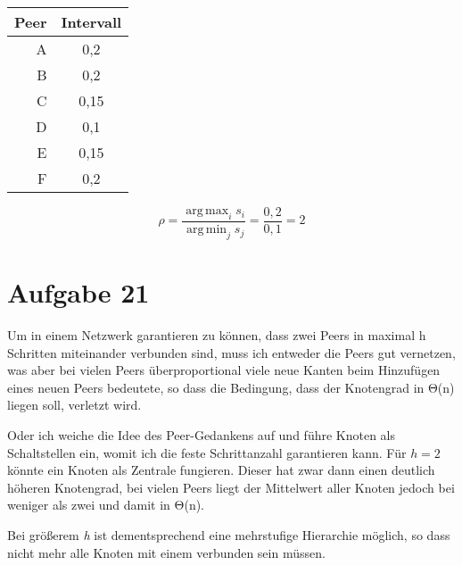 \documentclass[10pt,a4paper]{article}
\DeclareMathOperator*{\argmax}{arg\,max}
\DeclareMathOperator*{\argmin}{arg\,min}
\begin{document}
\begin{tabular}{ r | c }
  Peer & Intervall \\
  \hline
  A & 0,2 \\
  B & 0,2 \\
  C & 0,15 \\
  D & 0,1 \\
  E & 0,15 \\
  F & 0,2 \\
\end{tabular}

\begin{equation}
  \rho = \frac{\argmax_i s_i}{\argmin_j s_j} = \frac{0,2}{0,1} = 2
\end{equation}

\section*{Aufgabe 21}
Um in einem Netzwerk garantieren zu können, dass zwei Peers in maximal h Schritten miteinander verbunden sind, muss ich entweder die Peers gut vernetzen, was aber bei vielen Peers überproportional viele neue Kanten beim Hinzufügen eines neuen Peers bedeutete, so dass die Bedingung, dass der Knotengrad in Θ(n) liegen soll, verletzt wird.

Oder ich weiche die Idee des Peer-Gedankens auf und führe Knoten als Schaltstellen ein, womit ich die feste Schrittanzahl garantieren kann. Für $h=2$ könnte ein Knoten als Zentrale fungieren. Dieser hat zwar dann einen deutlich höheren Knotengrad, bei vielen Peers liegt der Mittelwert aller Knoten jedoch bei weniger als zwei und damit in Θ(n).

Bei größerem \textit{h} ist dementsprechend eine mehrstufige Hierarchie möglich, so dass nicht mehr alle Knoten mit einem verbunden sein müssen.
\end{document}
